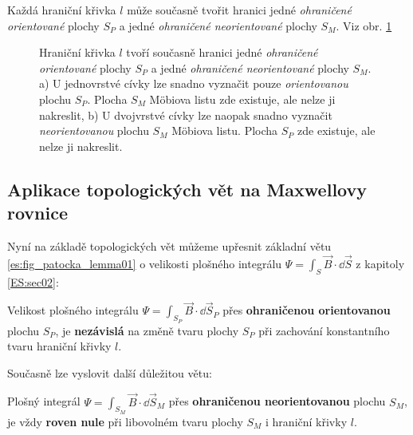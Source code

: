       \begin{lemma}\label{ES:lem_topol08}
        Každá hraniční křivka \(l\) může současně tvořit hranici jedné \emph{ohraničené 
          orientované} plochy \(S_P\) a jedné \emph{ohraničené neorientované} plochy \(S_M\). Viz 
        obr. \ref{es:fig_patocka_topol16}
        \begin{figure}[ht!]
          \centering  
          \caption{Hraniční křivka \(l\) tvoří současně hranici jedné \emph{ohraničené orientované} 
            plochy \(S_P\) a jedné \emph{ohraničené neorientované} plochy \(S_M\). a) U 
            jednovrstvé cívky lze snadno vyznačit pouze \emph{orientovanou} plochu \(S_P\). 
            Plocha \(S_M\) Möbiova listu zde existuje, ale nelze ji nakreslit, b) 
            U dvojvrstvé cívky lze naopak snadno vyznačit \emph{neorientovanou} plochu 
            \(S_M\) Möbiova listu. Plocha \(S_P\) zde existuje, ale nelze ji 
            nakreslit.\cite[s.~56]{Patocka4}} 
          \label{es:fig_patocka_topol16}
        \end{figure}
      \end{lemma}
    
    \subsection{Aplikace topologických vět na Maxwellovy rovnice}\label{teo:IchapIIsecIIsubIV}
      Nyní na základě topologických vět můžeme upřesnit základní větu \ref{es:fig_patocka_lemma01} 
      o velikosti plošného integrálu \(\Psi = \int_S\vec{B}\cdot \dd{\vec{S}}\) z kapitoly 
      \ref{ES:sec02}:
      \begin{lemma}\label{ES:lem_topol09}
        Velikost plošného integrálu \(\Psi = \int_{S_P}\vec{B}\cdot \dd{\vec{S}}_P\) přes 
        \textbf{ohraničenou orientovanou} plochu \(S_P\), je \textbf{nezávislá} na změně tvaru 
        plochy \(S_P\) při zachování konstantního tvaru hraniční křivky \(l\).        
      \end{lemma}
      Současně lze vyslovit další důležitou větu:
      \begin{lemma}\label{ES:lem_topol10}
        Plošný integrál \(\Psi = \int_{S_M}\vec{B}\cdot \dd{\vec{S}}_M\) přes \textbf{ohraničenou 
        neorientovanou} plochu \(S_M\), je vždy \textbf{roven nule} při libovolném tvaru plochy 
        \(S_M\) i hraniční křivky \(l\).        
      \end{lemma}
      

